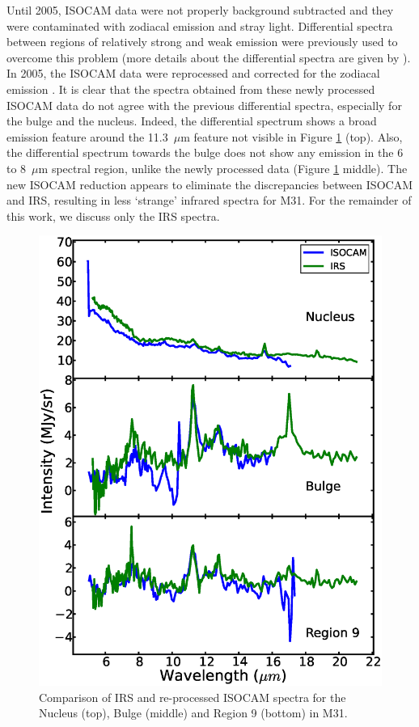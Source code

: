 Until 2005, ISOCAM data were not properly background subtracted and they were contaminated with zodiacal emission and stray light. 
Differential spectra between regions of relatively strong and weak emission were previously used to overcome this problem 
(more details about the differential spectra are given by \citealt{1998Cesarsky}). In 2005, the ISOCAM data were reprocessed 
and corrected for the zodiacal emission \citep{Boulanger_F_2005}. It is clear that the spectra obtained from these newly processed ISOCAM data 
do not agree with the previous differential spectra, especially for the bulge and the nucleus. Indeed, the differential spectrum shows a broad emission feature
around the 11.3~$\mu$m feature not visible in Figure \ref{ISOnIRS} (top). Also, the differential spectrum towards the bulge does not show 
any emission in the 6 to 8~$\mu$m spectral region, unlike the newly processed data (Figure \ref{ISOnIRS} middle).
The new ISOCAM reduction appears to eliminate the discrepancies between ISOCAM and IRS, resulting
in less `strange' infrared spectra for M31. For the remainder of this work, we discuss only the IRS spectra.


\begin{figure}
\centering
\includegraphics[scale=0.35]{./ISOvsIRS.eps}
\caption{ Comparison of  IRS and re-processed ISOCAM spectra for the Nucleus (top), Bulge (middle) and Region 9 (bottom) in M31.}
\label{ISOnIRS}
\end{figure}



